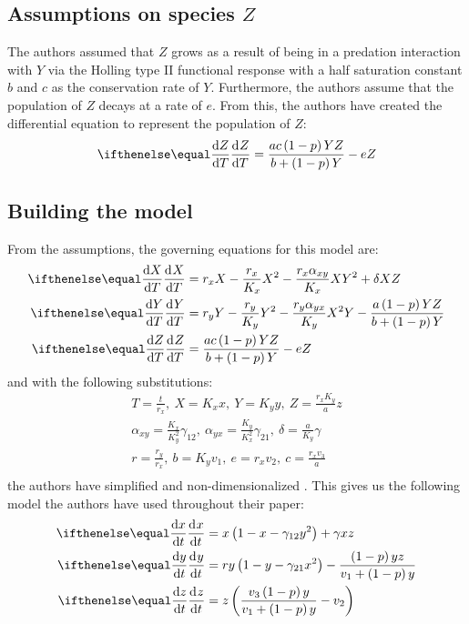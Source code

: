 \subsection{Assumptions on species $Z$}\label{subsec:assumptions_z}
The authors assumed that $Z$ grows as a result of being in a predation interaction with $Y$ via the Holling type II functional response with a half saturation constant $b$ and $c$ as the conservation rate of $Y$. Furthermore, the authors assume that the population of $Z$ decays at a rate of $e$. From this, the authors have created the differential equation to represent the population of $Z$:
\begin{equation}
    \diff[]{Z}{T} = \frac{ac\left(1-p\right)YZ}{b+\left(1-p\right)Y}-eZ
    \label{eq:2.3}
\end{equation}

\subsection{Building the model}\label{subsec:model}
From the assumptions, the governing equations for this model are:
\begin{subequations}
    \begin{align}
        \diff[]{X}{T} &= r_xX-\frac{r_x}{K_x}X^2-\frac{r_x\alpha_{xy}}{K_x}XY^2+\delta XZ
        \label{model:2.1a}\\
        \diff[]{Y}{T} &= r_yY-\frac{r_y}{K_y}Y^2-\frac{r_y\alpha_{yx}}{K_y}X^2Y-\frac{a\left(1-p\right)YZ}{b+\left(1-p\right)Y}
        \label{model:2.b}\\
        \diff[]{Z}{T} &= \frac{ac\left(1-p\right)YZ}{b+\left(1-p\right)Y}-eZ
        \label{model:2.1c}
    \end{align}
    \label{model:2.1}
\end{subequations}
and with the following substitutions:
\begin{gather*}
    T=\frac{t}{r_x},\ X=K_xx,\ Y=K_yy,\ Z=\frac{r_xK_y}{a}z\\
    \alpha_{xy}=\frac{K_x}{K_y^2}\gamma_{12},\ \alpha_{yx}=\frac{K_y}{K_x^2}\gamma_{21},\ \delta=\frac{a}{K_y}\gamma\\
    r=\frac{r_y}{r_x},\ b=K_yv_1,\ e=r_xv_2,\ c=\frac{r_xv_3}{a}\\
\end{gather*}
the authors have simplified and non-dimensionalized . This gives us the following model the authors have used throughout their paper:
\begin{subequations}
    \begin{align}
        \diff[]{x}{t} &= x\left(1-x-\gamma_{12}y^2\right)+\gamma xz
        \label{model:2.2a}\\
        \diff[]{y}{t} &= ry\left(1-y-\gamma_{21}x^2\right)-\frac{\left(1-p\right)yz}{v_1+\left(1-p\right)y}
        \label{model:2.2b}\\
        \diff[]{z}{t} &= z\left(\frac{v_3\left(1-p\right)y}{v_1+\left(1-p\right)y}-v_2\right)
        \label{model:2.2c}
    \end{align}
    \label{model:2.2}
\end{subequations}